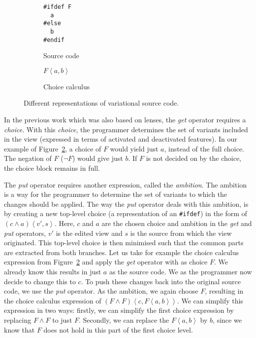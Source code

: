 \begin{figure}
  \centering
  \begin{subfigure}[b]{0.4\textwidth}
    \centering
    \begin{BVerbatim}
#ifdef F
  a
#else
  b
#endif
    \end{BVerbatim}
    \caption{Source code}
    \label{fig:representations:sourcecode}
  \end{subfigure}
  \hfill
  \begin{subfigure}[b]{0.4\textwidth}
    \centering
    \(\mathit{F}\!\left<a,b\right>\)
    \caption{Choice calculus}
    \label{fig:representations:choicecalculus}
  \end{subfigure}
  \caption{Different representations of variational source code.}
  \label{fig:representations}
\end{figure}

In the previous work which was also based on lenses, the \emph{get} operator 
requires a \emph{choice}. With this \emph{choice}, the programmer determines 
the set of variants included in the view (expressed in terms of activated and
deactivated features). In our example of Figure~\ref{fig:representations:choicecalculus},
a choice of $F$ would yield just $a$, instead of the full choice. The negation of
$F$ (\(\neg\mathit{F}\)) would give just $b$. If $F$ is not decided on by the choice,
the choice block remains in full.

The \emph{put} operator requires another expression, called the \emph{ambition}.
The ambition is a way for the programmer to determine the set of variants to
which the changes should be applied. The way the \emph{put} operator deals with
this ambition, is by creating a new top-level choice (a representation of an
\texttt{\#ifdef}) in the form of \( \left(c \land a\right)\!\left<v', s\right> \).
Here, $c$ and $a$ are the chosen choice and ambition in the \emph{get} and
\emph{put} operators, $v'$ is the edited view and $s$ is the source from which
the view originated. This top-level choice is then minimised such that the
common parts are extracted from both branches. Let us take for example the choice
calculus expression from Figure~\ref{fig:representations:choicecalculus} and apply
the \emph{get} operator with as choice $F$. We already know this results in just $a$
as the source code. We as the programmer now decide to change this to $c$. To push
these changes back into the original source code, we use the \emph{put} operator.
As the ambition, we again choose $F$, resulting in the choice calculus expression of
\(\mathit{\left(F \land F\right)}\!\left<c,\mathit{F}\!\left<a,b\right>\right>\).
We can simplify this expression in two ways: firstly, we can simplify the first 
choice expression by replacing \(\mathit{F} \land \mathit{F}\) to just \(\mathit{F}\).
Secondly, we can replace the \(\mathit{F}\!\left<a,b\right>\) by $b$, since we know
that $F$ does not hold in this part of the first choice level.

